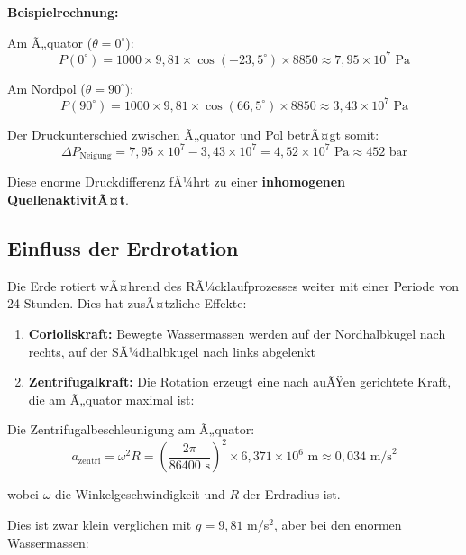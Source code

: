 ﻿\documentclass[12pt,a4paper]{report}
\begin{document}
\textbf{Beispielrechnung:}

Am Ã„quator ($\theta = 0^\circ$):
\begin{equation}
	P(0^\circ) = 1000 \times 9{,}81 \times \cos(-23{,}5^\circ) \times 8850 \approx 7{,}95 \times 10^7 \text{ Pa}
\end{equation}

Am Nordpol ($\theta = 90^\circ$):
\begin{equation}
	P(90^\circ) = 1000 \times 9{,}81 \times \cos(66{,}5^\circ) \times 8850 \approx 3{,}43 \times 10^7 \text{ Pa}
\end{equation}

Der Druckunterschied zwischen Ã„quator und Pol betrÃ¤gt somit:
\begin{equation}
	\Delta P_{\text{Neigung}} = 7{,}95 \times 10^7 - 3{,}43 \times 10^7 = 4{,}52 \times 10^7 \text{ Pa} \approx 452 \text{ bar}
\end{equation}

Diese enorme Druckdifferenz fÃ¼hrt zu einer \textbf{inhomogenen QuellenaktivitÃ¤t}.

\subsection{Einfluss der Erdrotation}

Die Erde rotiert wÃ¤hrend des RÃ¼cklaufprozesses weiter mit einer Periode von 24 Stunden. Dies hat zusÃ¤tzliche Effekte:

\begin{enumerate}
	\item \textbf{Corioliskraft:} Bewegte Wassermassen werden auf der Nordhalbkugel nach rechts, auf der SÃ¼dhalbkugel nach links abgelenkt
	
	\item \textbf{Zentrifugalkraft:} Die Rotation erzeugt eine nach auÃŸen gerichtete Kraft, die am Ã„quator maximal ist:
\end{enumerate}

Die Zentrifugalbeschleunigung am Ã„quator:
\begin{equation}
	a_{\text{zentri}} = \omega^2 R = \left(\frac{2\pi}{86400 \text{ s}}\right)^2 \times 6{,}371 \times 10^6 \text{ m} \approx 0{,}034 \text{ m/s}^2
\end{equation}

wobei $\omega$ die Winkelgeschwindigkeit und $R$ der Erdradius ist.

Dies ist zwar klein verglichen mit $g = 9{,}81$ m/s$^2$, aber bei den enormen Wassermassen:
\end{document}
